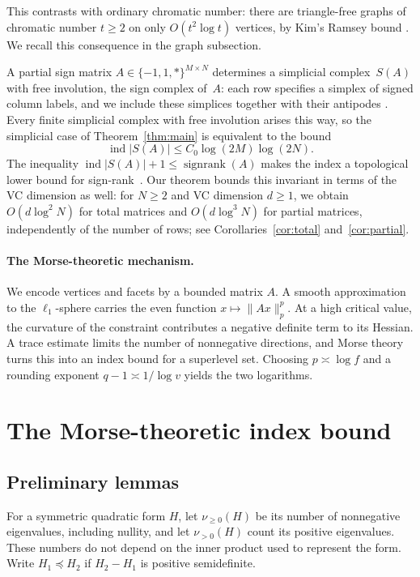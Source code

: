 \documentclass[11pt]{article}
\theoremstyle{remark}
\DeclareMathOperator{\ind}{ind}
\newcommand{\nuplus}{\nu_{\geq 0}}
\begin{document}
This contrasts with ordinary chromatic number: there are
triangle-free graphs of chromatic number $t\geq2$ on only
$O(t^2\log t)$ vertices, by Kim's Ramsey bound \cite{Kim}.
We recall this consequence in the graph subsection.

 A partial sign matrix
$A\in\{-1,1,*\}^{M\times N}$ determines a simplicial complex~$S(A)$ with free involution, the sign complex of~$A$: each row specifies a simplex of signed column labels, and
we include these simplices together with their antipodes
\cite{FHV}. Every finite simplicial complex with free involution arises this way,
so the simplicial case of Theorem~\ref{thm:main} is equivalent to
the bound
\[
 \ind|S(A)|\leq C_0\log(2M)\log(2N).
\]
The inequality
$\ind|S(A)|+1\leq\operatorname{signrank}(A)$ makes the index a
topological lower bound for sign-rank~\cite{FHV}. Our theorem
bounds this invariant in terms of the VC dimension as well:
for $N\geq2$ and VC dimension $d\geq1$, we obtain
$O(d\log^2 N)$ for total matrices and $O(d\log^3 N)$ for partial
matrices, independently of the number of rows; see
Corollaries~\ref{cor:total} and~\ref{cor:partial}.


\paragraph{The Morse-theoretic mechanism.}
We encode vertices and facets by a bounded matrix $A$. A smooth
approximation to the $\ell_1$-sphere carries the even function
$x\mapsto\|Ax\|_p^p$. At a high critical value, the curvature of the
constraint contributes a negative definite term to its Hessian.
A trace estimate limits the number of nonnegative directions, and
Morse theory turns this into an index bound for a superlevel set.
Choosing $p\asymp\log f$ and a rounding exponent
$q-1\asymp1/\log v$ yields the two logarithms.

\section{The Morse-theoretic index bound}\label{sec:morse}

\subsection{Preliminary lemmas}

For a symmetric quadratic form $H$, let $\nuplus(H)$ be its number of
nonnegative eigenvalues, including nullity, and let $\nu_{>0}(H)$ count
its positive eigenvalues. These numbers do not depend on the inner
product used to represent the form.
Write $H_1\preceq H_2$ if $H_2-H_1$ is positive semidefinite.
\end{document}
